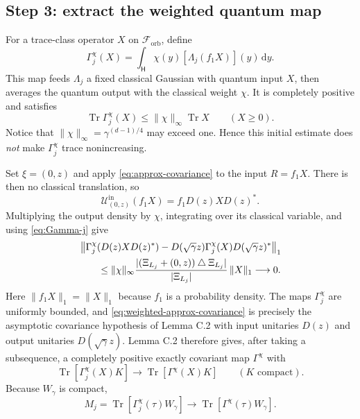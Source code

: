 \documentclass[11pt]{article}
\newcommand{\Hc}{\mathsf H}
\newcommand{\F}{\mathcal F_{\mathrm{orb}}}
\newcommand{\Tr}{\operatorname{Tr}}
\newcommand{\dd}{\,\mathrm d}
\begin{document}
\subsection*{Step 3: extract the weighted quantum map}

For a trace-class operator $X$ on $\F$, define
\begin{equation}\label{eq:Gamma-j}
  \Gamma_j^\chi(X)
  =\int_{\Hc}\chi(y)[\Lambda_j(f_1X)](y)\dd y.
\end{equation}
This map feeds $\Lambda_j$ a fixed classical Gaussian with quantum input
$X$, then averages the quantum output with the classical weight $\chi$.
It is completely positive and satisfies
\[
  \Tr\Gamma_j^\chi(X)
  \leq\|\chi\|_\infty\Tr X
  \qquad(X\geq0).
\]
Notice that $\|\chi\|_\infty=\gamma^{(d-1)/4}$ may exceed one.  Hence this
initial estimate does \emph{not} make $\Gamma_j^\chi$ trace nonincreasing.

Set $\xi=(0,z)$ and apply \eqref{eq:approx-covariance} to the input
$R=f_1X$.  There is then no classical translation, so
\[
  \mathcal U_{(0,z)}^{\mathrm{in}}(f_1X)
  =f_1D(z)XD(z)^*.
\]
Multiplying the output density by $\chi$, integrating over its classical
variable, and using \eqref{eq:Gamma-j} give
\begin{align}
 &\left\|
   \Gamma_j^\chi(D(z)XD(z)^*)
   -D(\sqrt\gamma z)\Gamma_j^\chi(X)D(\sqrt\gamma z)^*
  \right\|_1\notag\\
 &\qquad\leq
  \|\chi\|_\infty
  \frac{|(\Xi_{L_j}+(0,z))\mathbin\triangle\Xi_{L_j}|}
       {|\Xi_{L_j}|}\,\|X\|_1
  \longrightarrow0.
  \label{eq:weighted-approx-covariance}
\end{align}
Here $\|f_1X\|_1=\|X\|_1$ because $f_1$ is a probability density.
The maps $\Gamma_j^\chi$ are uniformly bounded, and
\eqref{eq:weighted-approx-covariance} is precisely the asymptotic covariance
hypothesis of Lemma C.2 with input unitaries $D(z)$ and output unitaries
$D(\sqrt\gamma z)$.  Lemma C.2 therefore gives, after taking a subsequence,
a completely positive exactly covariant map $\Gamma^\chi$ with
\begin{equation}\label{eq:quantum-limit}
  \Tr[\Gamma_j^\chi(X)K]
  \longrightarrow\Tr[\Gamma^\chi(X)K]
  \qquad(K\text{ compact}).
\end{equation}
Because $W_\gamma$ is compact,
\begin{equation}\label{eq:M-limit}
  M_j=\Tr[\Gamma_j^\chi(\tau)W_\gamma]
  \longrightarrow\Tr[\Gamma^\chi(\tau)W_\gamma].
\end{equation}
\end{document}
